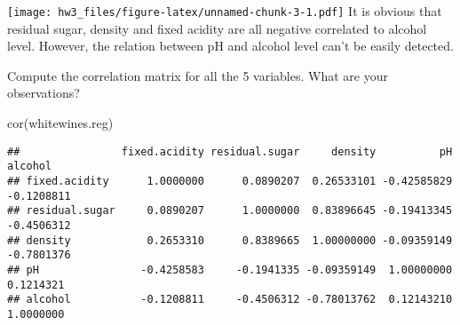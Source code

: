 \documentclass[
]{article}
\newenvironment{Shaded}{\begin{snugshade}}{\end{snugshade}}
\newcommand{\AttributeTok}[1]{\textcolor[rgb]{0.77,0.63,0.00}{#1}}
\newcommand{\DecValTok}[1]{\textcolor[rgb]{0.00,0.00,0.81}{#1}}
\newcommand{\FunctionTok}[1]{\textcolor[rgb]{0.00,0.00,0.00}{#1}}
\newcommand{\NormalTok}[1]{#1}
\newcommand{\SpecialCharTok}[1]{\textcolor[rgb]{0.00,0.00,0.00}{#1}}
\newcommand{\StringTok}[1]{\textcolor[rgb]{0.31,0.60,0.02}{#1}}
\begin{document}
\begin{Shaded}
\end{Shaded}

\texttt{[image: hw3\_files/figure-latex/unnamed-chunk-3-1.pdf]} It is
obvious that residual sugar, density and fixed acidity are all negative
correlated to alcohol level. However, the relation between pH and
alcohol level can't be easily detected.

Compute the correlation matrix for all the 5 variables. What are your
observations?

\begin{Shaded}
\begin{Highlighting}[]
\FunctionTok{cor}\NormalTok{(whitewines.reg)}
\end{Highlighting}
\end{Shaded}

\begin{verbatim}
##                fixed.acidity residual.sugar     density          pH    alcohol
## fixed.acidity      1.0000000      0.0890207  0.26533101 -0.42585829 -0.1208811
## residual.sugar     0.0890207      1.0000000  0.83896645 -0.19413345 -0.4506312
## density            0.2653310      0.8389665  1.00000000 -0.09359149 -0.7801376
## pH                -0.4258583     -0.1941335 -0.09359149  1.00000000  0.1214321
## alcohol           -0.1208811     -0.4506312 -0.78013762  0.12143210  1.0000000
\end{verbatim}
\end{document}
